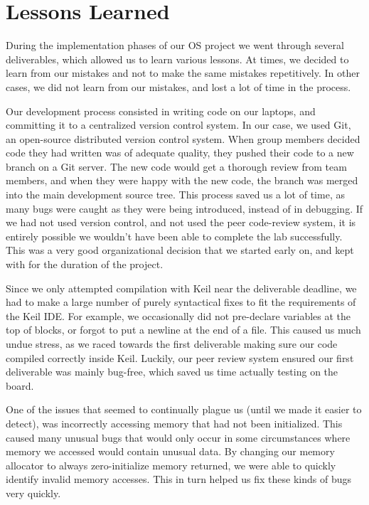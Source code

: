 \documentclass[12pt]{report}
\begin{document}
\part{Lessons Learned}

    During the implementation phases of our OS project we went through several
    deliverables, which allowed us to learn various lessons. At times, we
    decided to learn from our mistakes and not to make the same mistakes
    repetitively. In other cases, we did not learn from our mistakes, and lost a
    lot of time in the process.

    Our development process consisted in writing code on our laptops, and
    committing it to a centralized version control system. In our case, we used
    Git, an open-source distributed version control system. When group members
    decided code they had written was of adequate quality, they pushed their
    code to a new branch on a Git server. The new code would get a thorough
    review from team members, and when they were happy with the new code, the
    branch was merged into the main development source tree. This process saved
    us a lot of time, as many bugs were caught as they were being introduced,
    instead of in debugging. If we had not used version control, and not used
    the peer code-review system, it is entirely possible we wouldn't have been
    able to complete the lab successfully. This was a very good organizational
    decision that we started early on, and kept with for the duration of the
    project.

    Since we only attempted compilation with Keil near the deliverable deadline,
    we had to make a large number of purely syntactical fixes to fit the
    requirements of the Keil IDE. For example, we occasionally did not
    pre-declare variables at the top of blocks, or forgot to put a newline at
    the end of a file.
    This caused us much undue stress, as we raced towards the first deliverable
    making sure our code compiled correctly inside Keil. Luckily, our peer
    review system ensured our first deliverable was mainly bug-free, which saved
    us time actually testing on the board.

    One of the issues that seemed to continually plague us (until we made it
    easier to detect), was incorrectly accessing memory that had not been
    initialized. This caused many unusual bugs that would only occur in some
    circumstances where memory we accessed would contain unusual data. By
    changing our memory allocator to always zero-initialize memory returned, we
    were able to quickly identify invalid memory accesses. This in turn helped
    us fix these kinds of bugs very quickly.
\end{document}
